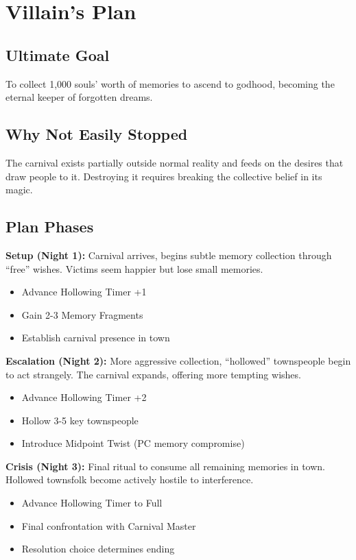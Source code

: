 \documentclass[11pt]{article}
\begin{document}
\section{Villain's Plan}

\subsection{Ultimate Goal}
To collect 1,000 souls' worth of memories to ascend to godhood, becoming the eternal keeper of forgotten dreams.

\subsection{Why Not Easily Stopped}
The carnival exists partially outside normal reality and feeds on the desires that draw people to it. Destroying it requires breaking the collective belief in its magic.

\subsection{Plan Phases}

\textbf{Setup (Night 1):} Carnival arrives, begins subtle memory collection through ``free'' wishes. Victims seem happier but lose small memories.
\begin{itemize}
\item Advance Hollowing Timer +1
\item Gain 2-3 Memory Fragments
\item Establish carnival presence in town
\end{itemize}

\textbf{Escalation (Night 2):} More aggressive collection, ``hollowed'' townspeople begin to act strangely. The carnival expands, offering more tempting wishes.
\begin{itemize}
\item Advance Hollowing Timer +2
\item Hollow 3-5 key townspeople
\item Introduce Midpoint Twist (PC memory compromise)
\end{itemize}

\textbf{Crisis (Night 3):} Final ritual to consume all remaining memories in town. Hollowed townsfolk become actively hostile to interference.
\begin{itemize}
\item Advance Hollowing Timer to Full
\item Final confrontation with Carnival Master
\item Resolution choice determines ending
\end{itemize}
\end{document}
